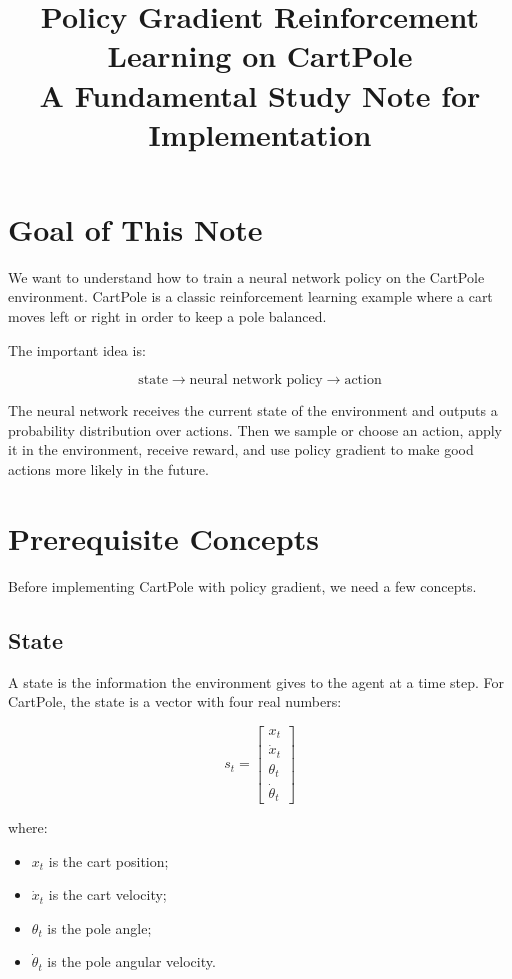 \documentclass[11pt]{article}
\title{Policy Gradient Reinforcement Learning on CartPole\\
\large A Fundamental Study Note for Implementation}
\author{}
\date{}
\begin{document}
\maketitle

\section{Goal of This Note}

We want to understand how to train a neural network policy on the CartPole environment.
CartPole is a classic reinforcement learning example where a cart moves left or right in order to keep a pole balanced.

The important idea is:

\[
\boxed{
\text{state} \rightarrow \text{neural network policy} \rightarrow \text{action}
}
\]

The neural network receives the current state of the environment and outputs a probability distribution over actions.
Then we sample or choose an action, apply it in the environment, receive reward, and use policy gradient to make good actions more likely in the future.

\section{Prerequisite Concepts}

Before implementing CartPole with policy gradient, we need a few concepts.

\subsection{State}

A state is the information the environment gives to the agent at a time step.
For CartPole, the state is a vector with four real numbers:

\[
 s_t =
 \begin{bmatrix}
 x_t \\
 \dot{x}_t \\
 \theta_t \\
 \dot{\theta}_t
 \end{bmatrix}
\]

where:

\begin{itemize}[leftmargin=2em]
    \item $x_t$ is the cart position;
    \item $\dot{x}_t$ is the cart velocity;
    \item $\theta_t$ is the pole angle;
    \item $\dot{\theta}_t$ is the pole angular velocity.
\end{itemize}
\end{document}
